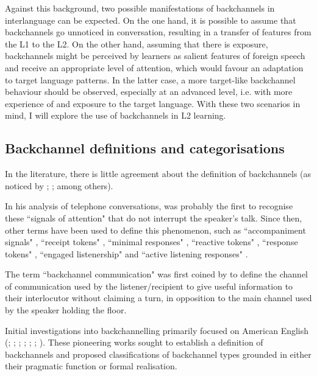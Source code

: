Against this background, two possible manifestations of backchannels in interlanguage can be expected. On the one hand, it is possible to assume that backchannels go unnoticed in conversation, resulting in a transfer of features from the L1 to the L2. On the other hand, assuming that there is exposure, backchannels might be perceived by learners as salient features of foreign speech and receive an appropriate level of attention, which would favour an adaptation to target language patterns. In the latter case, a more target-like backchannel behaviour should be observed, especially at an advanced level, i.e. with more experience of and exposure to the target language. With these two scenarios in mind, I will explore the use of backchannels in L2 learning.

\subsection{Backchannel definitions and categorisations}
\label{sec:4.1.2}
In the literature, there is little agreement about the definition of backchannels (as noticed by \citealt{Lennon1990,Lennon2000}; \citealt{Rühlemann2007}; \citealt{Wolf2008} among others).

In his analysis of telephone conversations, \citet{Fries1952} was probably the first to recognise these ``signals of attention" that do not interrupt the speaker’s talk. Since then, other terms have been used to define this phenomenon, such as ``accompaniment signals" \citep{Kendon1967}, ``receipt tokens" \citep{Heritage1984}, ``minimal responses" \citep{Fellegy1995}, ``reactive tokens" \citep{ClancyEtAl1996}, ``response tokens" \citep{Gardner2001}, ``engaged listenership" \citep{Lambertz2011} and ``active listening responses" \citep{Simon2018}.

The term ``backchannel communication" was first coined by \citet{Yngve1970} to define the channel of communication used by the listener/recipient to give useful information to their interlocutor without claiming a turn, in opposition to the main channel used by the speaker holding the floor.

Initial investigations into backchannelling primarily focused on American English (\citealt{Duncan1974}; \citealt{DuncanFiske1977}; \citealt{Fries1952}; \citealt{Goodwin1986}; \citealt{Jefferson1983}; \citealt{Schegloff1982}; \citealt{Yngve1970}). These pioneering works sought to establish a definition of backchannels and proposed classifications of backchannel types grounded in either their pragmatic function or formal realisation.

